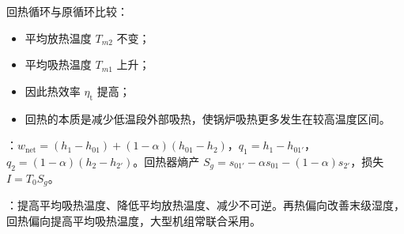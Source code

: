 回热循环与原循环比较：
\begin{itemize}
    \item 平均放热温度 $T_{m2}$ 不变；
    \item 平均吸热温度 $T_{m1}$ 上升；
    \item 因此热效率 $\eta_{\mathrm{t}}$ 提高；
    \item 回热的本质是减少低温段外部吸热，使锅炉吸热更多发生在较高温度区间。
\end{itemize}

：$w_{\mathrm{net}}=(h_1-h_{01})+(1-\alpha)(h_{01}-h_2)$，$q_1=h_1-h_{01'}$，$q_2=(1-\alpha)(h_2-h_{2'})$。回热器熵产 $S_g=s_{01'}-\alpha s_{01}-(1-\alpha)s_{2'}$，损失 $I=T_0S_g$。

：提高平均吸热温度、降低平均放热温度、减少不可逆。再热偏向改善末级湿度，回热偏向提高平均吸热温度，大型机组常联合采用。

\divider
